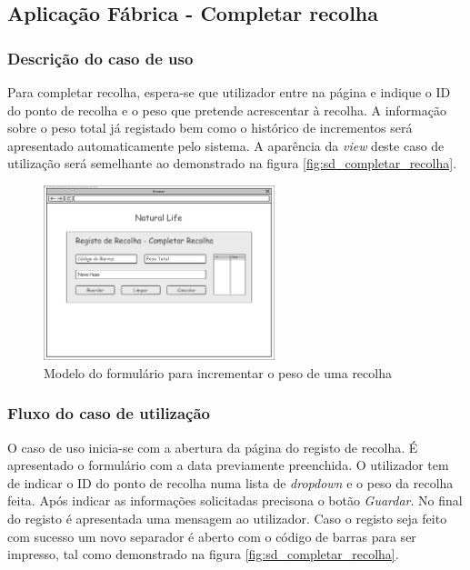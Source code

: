 \subsection{Aplicação Fábrica - Completar recolha}
\subsubsection*{Descrição do caso de uso}
Para completar recolha, espera-se que utilizador entre na página e indique o ID do ponto de recolha e o peso que pretende acrescentar à recolha. A informação sobre o peso total já registado bem como o histórico de incrementos será apresentado automaticamente pelo sistema. A aparência da \textit{view} deste caso de utilização será semelhante ao demonstrado na figura \ref{fig:sd_completar_recolha}. 

\begin{figure}[H] 
	\begin{center}
		\includegraphics[width=0.60\textwidth,keepaspectratio]{figuras/Diagramas_vp/DI_Fabrica_7_Completa_Recolha.jpg}
		\caption{Modelo do formulário para incrementar o peso de uma recolha}
		\label{fig:di_completar_recolha} 
	\end{center}
\end{figure}

\subsubsection*{Fluxo do caso de utilização}
O caso de uso inicia-se com a abertura da página do registo de recolha. É apresentado o formulário com a data previamente preenchida. O utilizador tem de indicar o ID do ponto de recolha numa lista de \textit{dropdown} e o peso da recolha feita. Após indicar as informações solicitadas precisona o botão \textit{Guardar}. No final do registo é apresentada uma mensagem ao utilizador. Caso o registo seja feito com sucesso um novo separador é aberto com o código de barras para ser impresso, tal como demonstrado na figura \ref{fig:sd_completar_recolha}.


